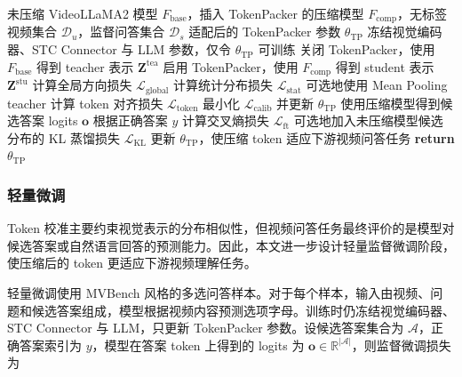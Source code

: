 \begin{algorithm}[!htbp]
    \caption{\label{alg:token-calibration-finetune}Token 校准与轻量微调训练流程}
    \begin{algorithmic}[1]
        \REQUIRE 未压缩 VideoLLaMA2 模型 $F_{\mathrm{base}}$，插入 TokenPacker 的压缩模型 $F_{\mathrm{comp}}$，无标签视频集合 $\mathcal{D}_{u}$，监督问答集合 $\mathcal{D}_{s}$
        \ENSURE 适配后的 TokenPacker 参数 $\theta_{\mathrm{TP}}$
        \STATE 冻结视觉编码器、STC Connector 与 LLM 参数，仅令 $\theta_{\mathrm{TP}}$ 可训练
            \STATE 关闭 TokenPacker，使用 $F_{\mathrm{base}}$ 得到 teacher 表示 $\mathbf{Z}^{\mathrm{tea}}$
            \STATE 启用 TokenPacker，使用 $F_{\mathrm{comp}}$ 得到 student 表示 $\mathbf{Z}^{\mathrm{stu}}$
            \STATE 计算全局方向损失 $\mathcal{L}_{\mathrm{global}}$
            \STATE 计算统计分布损失 $\mathcal{L}_{\mathrm{stat}}$
            \STATE 可选地使用 Mean Pooling teacher 计算 token 对齐损失 $\mathcal{L}_{\mathrm{token}}$
            \STATE 最小化 $\mathcal{L}_{\mathrm{calib}}$ 并更新 $\theta_{\mathrm{TP}}$
        \ENDFOR
            \STATE 使用压缩模型得到候选答案 logits $\mathbf{o}$
            \STATE 根据正确答案 $y$ 计算交叉熵损失 $\mathcal{L}_{\mathrm{ft}}$
            \STATE 可选地加入未压缩模型候选分布的 KL 蒸馏损失 $\mathcal{L}_{\mathrm{KL}}$
            \STATE 更新 $\theta_{\mathrm{TP}}$，使压缩 token 适应下游视频问答任务
        \ENDFOR
        \STATE \textbf{return} $\theta_{\mathrm{TP}}$
    \end{algorithmic}
\end{algorithm}

\subsubsection{轻量微调}

\par Token 校准主要约束视觉表示的分布相似性，但视频问答任务最终评价的是模型对候选答案或自然语言回答的预测能力。因此，本文进一步设计轻量监督微调阶段，使压缩后的 token 更适应下游视频理解任务。

\par 轻量微调使用 MVBench 风格的多选问答样本。对于每个样本，输入由视频、问题和候选答案组成，模型根据视频内容预测选项字母。训练时仍冻结视觉编码器、STC Connector 与 LLM，只更新 TokenPacker 参数。设候选答案集合为 $\mathcal{A}$，正确答案索引为 $y$，模型在答案 token 上得到的 logits 为 $\mathbf{o}\in\mathbb{R}^{|\mathcal{A}|}$，则监督微调损失为

